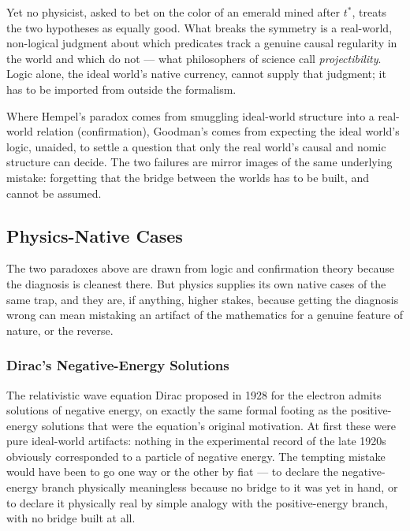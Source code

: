 Yet no physicist, asked to bet on the color of an emerald mined after $t^\ast$,
treats the two hypotheses as equally good. What breaks the symmetry is a
real-world, non-logical judgment about which predicates track a genuine causal
regularity in the world and which do not --- what philosophers of science call
\emph{projectibility}. Logic alone, the ideal world's native currency, cannot
supply that judgment; it has to be imported from outside the formalism.

Where Hempel's paradox comes from smuggling ideal-world structure into a
real-world relation (confirmation), Goodman's comes from expecting the ideal
world's logic, unaided, to settle a question that only the real world's causal
and nomic structure can decide. The two failures are mirror images of the same
underlying mistake: forgetting that the bridge between the worlds has to be
built, and cannot be assumed.

\subsection{Physics-Native Cases}

The two paradoxes above are drawn from logic and confirmation theory because
the diagnosis is cleanest there. But physics supplies its own native cases of
the same trap, and they are, if anything, higher stakes, because getting the
diagnosis wrong can mean mistaking an artifact of the mathematics for a genuine
feature of nature, or the reverse.

\subsubsection{Dirac's Negative-Energy Solutions}

The relativistic wave equation Dirac proposed in 1928 for the electron admits
solutions of negative energy, on exactly the same formal footing as the
positive-energy solutions that were the equation's original
motivation. At first these were pure ideal-world
artifacts: nothing in the experimental record of the late 1920s obviously
corresponded to a particle of negative energy. The tempting mistake would have
been to go one way or the other by fiat --- to declare the negative-energy
branch physically meaningless because no bridge to it was yet in hand, or to
declare it physically real by simple analogy with the positive-energy branch,
with no bridge built at all.

